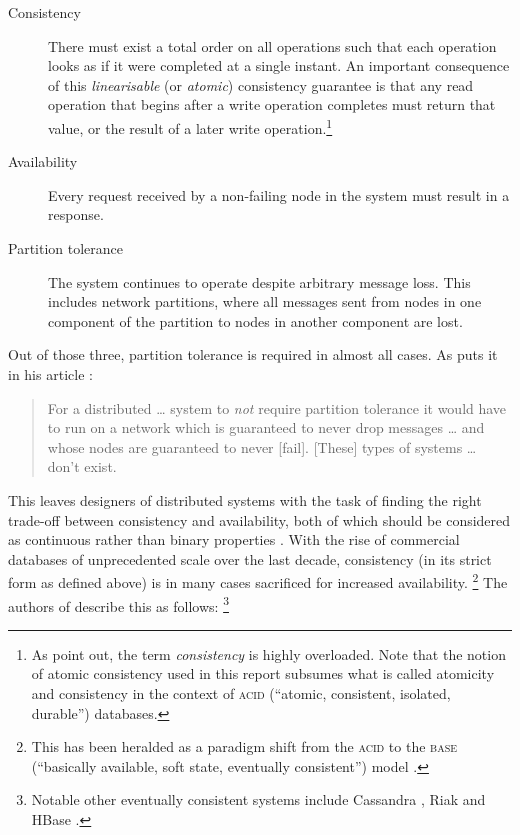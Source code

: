 \documentclass[11pt,chapterprefix=true,toc=bibliography,numbers=noendperiod,
               footnotes=multiple,twoside]{scrreprt}
\begin{document}
\begin{description}
    \item[Consistency] There must exist a total order on all operations such that each operation looks as if it were completed at a single instant. An important consequence of this \emph{linearisable} (or \emph{atomic}) consistency guarantee is that any read operation that begins after a write operation completes must return that value, or the result of a later write operation.\footnote{As \textcite{capproof} point out, the term \emph{consistency} is highly overloaded. Note that the notion of atomic consistency used in this report subsumes what is called atomicity and consistency in the context of \textsc{acid} (\enquote{atomic, consistent, isolated, durable}) databases.}
    \item[Availability] Every request received by a non-failing node in the system must result in a response.
    \item[Partition tolerance] The system continues to operate despite arbitrary message loss. This includes network partitions, where all messages sent from nodes in one component of the partition to nodes in another component are lost.
\end{description}

Out of those three, partition tolerance is required in almost all cases. As \citeauthor{needp} puts it in his article :

\begin{quote}
    For a distributed \dots{} system to \emph{not} require partition tolerance it would have to run on a network which is guaranteed to never drop messages \dots{} and whose nodes are guaranteed to never [fail]. [These] types of systems \dots{} don't exist.
\end{quote}

This leaves designers of distributed systems with the task of finding the right trade-off between consistency and availability, both of which should be considered as continuous rather than binary properties \autocite{cap12}. With the rise of commercial databases of unprecedented scale over the last decade, consistency (in its strict form as defined above) is in many cases sacrificed for increased availability.%
\footnote{This has been heralded as a paradigm shift from the \textsc{acid} to the \textsc{base} (\enquote{basically available, soft state, eventually consistent}) model \parencite{base}.} %
The authors of  describe this as follows:%
\footnote{Notable other eventually consistent systems include Cassandra , Riak  and HBase .}
\end{document}
